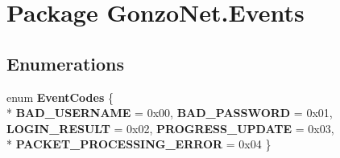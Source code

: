 \hypertarget{namespace_gonzo_net_1_1_events}{\section{Package Gonzo\+Net.\+Events}
\label{namespace_gonzo_net_1_1_events}
}
\subsection*{Enumerations}
\begin{DoxyCompactItemize}
\item 
\hypertarget{namespace_gonzo_net_1_1_events_a0752c8b592c008e60a80ad3f3bb3327f}{enum {\bfseries Event\+Codes} \{ \\*
{\bfseries B\+A\+D\+\_\+\+U\+S\+E\+R\+N\+A\+M\+E} = 0x00, 
{\bfseries B\+A\+D\+\_\+\+P\+A\+S\+S\+W\+O\+R\+D} = 0x01, 
{\bfseries L\+O\+G\+I\+N\+\_\+\+R\+E\+S\+U\+L\+T} = 0x02, 
{\bfseries P\+R\+O\+G\+R\+E\+S\+S\+\_\+\+U\+P\+D\+A\+T\+E} = 0x03, 
\\*
{\bfseries P\+A\+C\+K\+E\+T\+\_\+\+P\+R\+O\+C\+E\+S\+S\+I\+N\+G\+\_\+\+E\+R\+R\+O\+R} = 0x04
 \}}\label{namespace_gonzo_net_1_1_events_a0752c8b592c008e60a80ad3f3bb3327f}

\end{DoxyCompactItemize}
